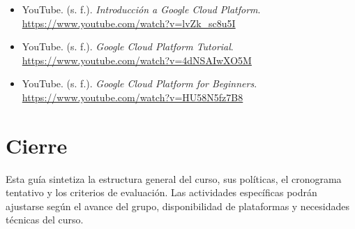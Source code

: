 \documentclass[
  coursetitle={Cómputo Nube y Tecnologías Emergentes},
  coursehours={96},
  coursedate={Verano 2026},
  doctype={Guía del curso},
  otherlangs={english,french},
  authorname={Lázaro},
  authorsurname={Bustio-Martínez},
  authortitle={PhD},
  role={Profesor Investigador},
  email={lbustio@inaoe.mx},
  phone={5559504000},
  ext={7459},
  institution={Instituto Nacional de Astrofísica, Óptica y Electrónica (INAOE)},
  department={Maestría en Ciencias en Tecnologías de Seguridad},
  address={Luis Enrique Erro 1, Sta. Ma. Tonantzintla, San Andrés Cholula, CP 72840, Puebla, México},
  margin={0.5in}
]{../../lbustio_lecture_notes}
\begin{document}
\begin{sloppypar}
\begin{itemize}[leftmargin=*]
  \item YouTube. (s. f.). \textit{Introducción a Google Cloud Platform}. \url{https://www.youtube.com/watch?v=lvZk_sc8u5I}

  \item YouTube. (s. f.). \textit{Google Cloud Platform Tutorial}. \url{https://www.youtube.com/watch?v=4dNSAIwXO5M}

  \item YouTube. (s. f.). \textit{Google Cloud Platform for Beginners}. \url{https://www.youtube.com/watch?v=HU58N5fz7B8}
\end{itemize}
\end{sloppypar}

\section{Cierre}
Esta guía sintetiza la estructura general del curso, sus políticas, el cronograma tentativo y los criterios de evaluación. Las actividades específicas podrán ajustarse según el avance del grupo, disponibilidad de plataformas y necesidades técnicas del curso.
\end{document}
